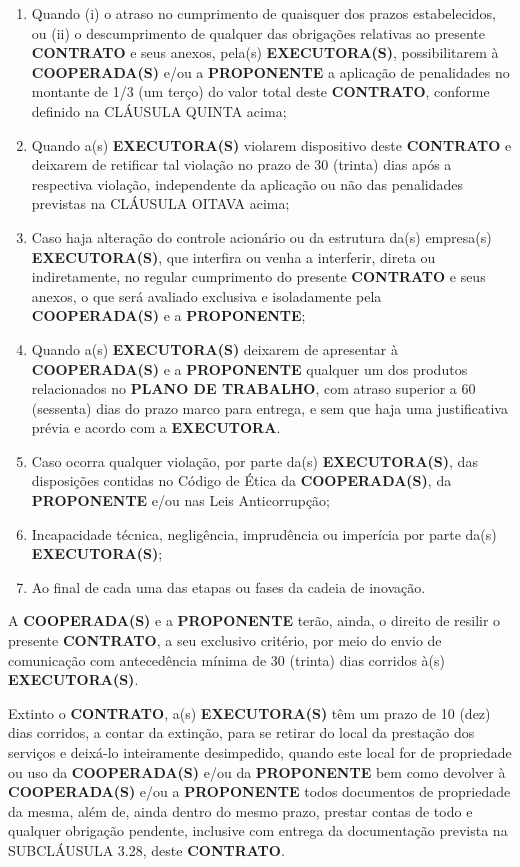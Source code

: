 \begin{enumerate}[label=\alph*)]
    \item Quando (i) o atraso no cumprimento de quaisquer dos prazos estabelecidos, ou (ii) o descumprimento de qualquer das obrigações relativas ao presente \textbf{CONTRATO} e seus anexos, pela(s) \textbf{EXECUTORA(S)}, possibilitarem à \textbf{COOPERADA(S)} e/ou a \textbf{PROPONENTE} a aplicação de penalidades no montante de 1/3 (um terço) do valor total deste \textbf{CONTRATO}, conforme definido na CLÁUSULA QUINTA acima;
    \item Quando a(s) \textbf{EXECUTORA(S)} violarem dispositivo deste \textbf{CONTRATO} e deixarem de retificar tal violação no prazo de 30 (trinta) dias após a respectiva violação, independente da aplicação ou não das penalidades previstas na CLÁUSULA OITAVA acima;
    \item Caso haja alteração do controle acionário ou da estrutura da(s) empresa(s) \textbf{EXECUTORA(S)}, que interfira ou venha a interferir, direta ou indiretamente, no regular cumprimento do presente \textbf{CONTRATO} e seus anexos, o que será avaliado exclusiva e isoladamente pela \textbf{COOPERADA(S)} e a \textbf{PROPONENTE};
    \item Quando a(s) \textbf{EXECUTORA(S)} deixarem de apresentar à \textbf{COOPERADA(S)} e a \textbf{PROPONENTE} qualquer um dos produtos relacionados no \textbf{PLANO DE TRABALHO}, com atraso superior a 60 (sessenta) dias do prazo marco para entrega, e sem que haja uma justificativa prévia e acordo com a \textbf{EXECUTORA}.
    \item Caso ocorra qualquer violação, por parte da(s) \textbf{EXECUTORA(S)}, das disposições contidas no Código de Ética da \textbf{COOPERADA(S)}, da \textbf{PROPONENTE} e/ou nas Leis Anticorrupção;
    \item Incapacidade técnica, negligência, imprudência ou imperícia por parte da(s) \textbf{EXECUTORA(S)};
    \item Ao final de cada uma das etapas ou fases da cadeia de inovação.

\end{enumerate}

\xx A \textbf{COOPERADA(S)} e a \textbf{PROPONENTE} terão, ainda, o direito de resilir o presente \textbf{CONTRATO}, a seu exclusivo critério, por meio do envio de comunicação com antecedência mínima de 30 (trinta) dias corridos à(s) \textbf{EXECUTORA(S)}.

\xx Extinto o \textbf{CONTRATO}, a(s) \textbf{EXECUTORA(S)} têm um prazo de 10 (dez) dias corridos, a contar da extinção, para se retirar do local da prestação dos serviços e deixá-lo inteiramente desimpedido, quando este local for de propriedade ou uso da \textbf{COOPERADA(S)} e/ou da \textbf{PROPONENTE} bem como devolver à \textbf{COOPERADA(S)} e/ou a \textbf{PROPONENTE} todos documentos de propriedade da mesma, além de, ainda dentro do mesmo prazo, prestar contas de todo e qualquer obrigação pendente, inclusive com entrega da documentação prevista na SUBCLÁUSULA 3.28, deste \textbf{CONTRATO}.

